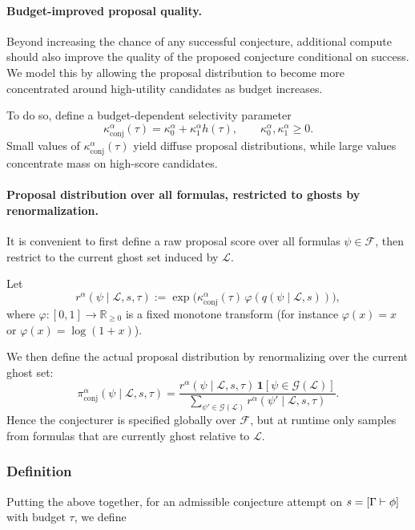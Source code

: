 \paragraph{Budget-improved proposal quality.}
Beyond increasing the chance of any successful conjecture, additional compute should also improve the quality of the proposed conjecture conditional on success. We model this by allowing the proposal distribution to become more concentrated around high-utility candidates as budget increases.

To do so, define a budget-dependent selectivity parameter
\[
\kappa^\alpha_{\mathrm{conj}}(\tau)
=
\kappa^\alpha_0+\kappa^\alpha_1 h(\tau),
\qquad
\kappa^\alpha_0,\kappa^\alpha_1\ge 0.
\]
Small values of $\kappa^\alpha_{\mathrm{conj}}(\tau)$ yield diffuse proposal distributions, while large values concentrate mass on high-score candidates.

\paragraph{Proposal distribution over all formulas, restricted to ghosts by renormalization.}
It is convenient to first define a raw proposal score over all formulas $\psi\in\mathcal F$, then restrict to the current ghost set induced by $\mathcal L$.

Let
\[
r^\alpha(\psi\mid \mathcal L,s,\tau)
:=
\exp\!\Big(\kappa^\alpha_{\mathrm{conj}}(\tau)\,\varphi(q(\psi\mid \mathcal L,s))\Big),
\]
where $\varphi:[0,1]\to\mathbb R_{\ge0}$ is a fixed monotone transform (for instance $\varphi(x)=x$ or $\varphi(x)=\log(1+x)$).

We then define the actual proposal distribution by renormalizing over the current ghost set:
\[
\pi^\alpha_{\mathrm{conj}}(\psi\mid \mathcal L,s,\tau)
=
\frac{r^\alpha(\psi\mid \mathcal L,s,\tau)\,\mathbf 1[\psi\in\mathcal G(\mathcal L)]}
{\sum_{\psi'\in\mathcal G(\mathcal L)} r^\alpha(\psi'\mid \mathcal L,s,\tau)}.
\]
Hence the conjecturer is specified globally over $\mathcal F$, but at runtime only samples from formulas that are currently ghost relative to $\mathcal L$.

\subsubsection{Definition}

Putting the above together, for an admissible conjecture attempt on $s=[\Gamma\vdash\phi]$ with budget $\tau$, we define

